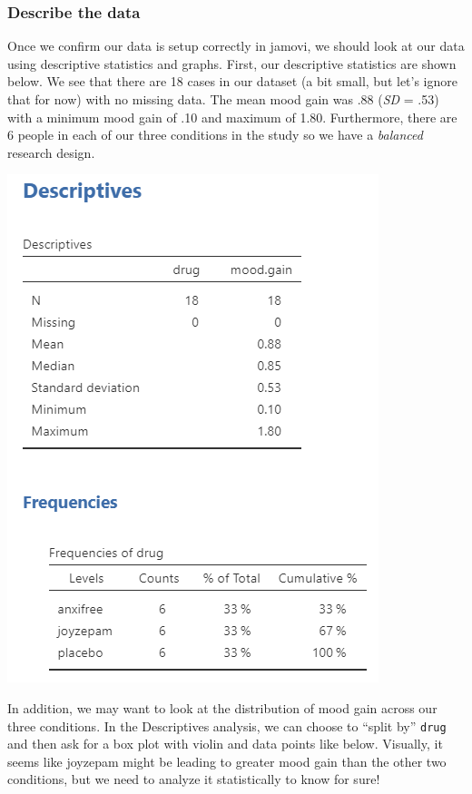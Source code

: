 \documentclass[
]{book}
\begin{document}
\hypertarget{describe-the-data-4}{%
\subsubsection{Describe the data}\label{describe-the-data-4}}

Once we confirm our data is setup correctly in jamovi, we should look at our data using descriptive statistics and graphs. First, our descriptive statistics are shown below. We see that there are 18 cases in our dataset (a bit small, but let's ignore that for now) with no missing data. The mean mood gain was .88 (\emph{SD} = .53) with a minimum mood gain of .10 and maximum of 1.80. Furthermore, there are 6 people in each of our three conditions in the study so we have a \emph{balanced} research design.

\includegraphics{images/04_one-way-anova/anova_descriptives.png}

In addition, we may want to look at the distribution of mood gain across our three conditions. In the Descriptives analysis, we can choose to ``split by'' \texttt{drug} and then ask for a box plot with violin and data points like below. Visually, it seems like joyzepam might be leading to greater mood gain than the other two conditions, but we need to analyze it statistically to know for sure!
\end{document}
